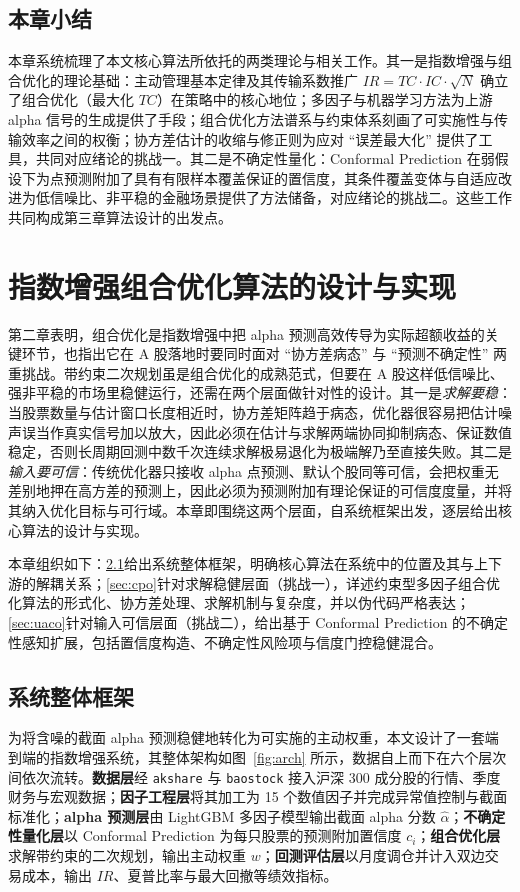 \section{本章小结}
本章系统梳理了本文核心算法所依托的两类理论与相关工作。其一是指数增强与组合优化的理论基础：主动管理基本定律及其传输系数推广 $IR=TC\cdot IC\cdot\sqrt{N}$ 确立了组合优化（最大化 $TC$）在策略中的核心地位；多因子与机器学习方法为上游 alpha 信号的生成提供了手段；组合优化方法谱系与约束体系刻画了可实施性与传输效率之间的权衡；协方差估计的收缩与修正则为应对 ``误差最大化'' 提供了工具，共同对应绪论的挑战一。其二是不确定性量化：Conformal Prediction 在弱假设下为点预测附加了具有有限样本覆盖保证的置信度，其条件覆盖变体与自适应改进为低信噪比、非平稳的金融场景提供了方法储备，对应绪论的挑战二。这些工作共同构成第三章算法设计的出发点。

\chapter{指数增强组合优化算法的设计与实现}

第二章表明，组合优化是指数增强中把 alpha 预测高效传导为实际超额收益的关键环节，也指出它在 A 股落地时要同时面对 ``协方差病态'' 与 ``预测不确定性'' 两重挑战。带约束二次规划虽是组合优化的成熟范式，但要在 A 股这样低信噪比、强非平稳的市场里稳健运行，还需在两个层面做针对性的设计。其一是\emph{求解要稳}：当股票数量与估计窗口长度相近时，协方差矩阵趋于病态，优化器很容易把估计噪声误当作真实信号加以放大，因此必须在估计与求解两端协同抑制病态、保证数值稳定，否则长周期回测中数千次连续求解极易退化为极端解乃至直接失败。其二是\emph{输入要可信}：传统优化器只接收 alpha 点预测、默认个股同等可信，会把权重无差别地押在高方差的预测上，因此必须为预测附加有理论保证的可信度度量，并将其纳入优化目标与可行域。本章即围绕这两个层面，自系统框架出发，逐层给出核心算法的设计与实现。

本章组织如下：\ref{sec:framework}给出系统整体框架，明确核心算法在系统中的位置及其与上下游的解耦关系；\ref{sec:cpo}针对求解稳健层面（挑战一），详述约束型多因子组合优化算法的形式化、协方差处理、求解机制与复杂度，并以伪代码严格表达；\ref{sec:uaco}针对输入可信层面（挑战二），给出基于 Conformal Prediction 的不确定性感知扩展，包括置信度构造、不确定性风险项与信度门控稳健混合。

\section{系统整体框架}
\label{sec:framework}

为将含噪的截面 alpha 预测稳健地转化为可实施的主动权重，本文设计了一套端到端的指数增强系统，其整体架构如图~\ref{fig:arch} 所示，数据自上而下在六个层次间依次流转。\textbf{数据层}经 \texttt{akshare} 与 \texttt{baostock} 接入沪深 300 成分股的行情、季度财务与宏观数据；\textbf{因子工程层}将其加工为 15 个数值因子并完成异常值控制与截面标准化；\textbf{alpha 预测层}由 LightGBM 多因子模型输出截面 alpha 分数 $\hat\alpha$；\textbf{不确定性量化层}以 Conformal Prediction 为每只股票的预测附加置信度 $c_i$；\textbf{组合优化层}求解带约束的二次规划，输出主动权重 $w$；\textbf{回测评估层}以月度调仓并计入双边交易成本，输出 $IR$、夏普比率与最大回撤等绩效指标。

